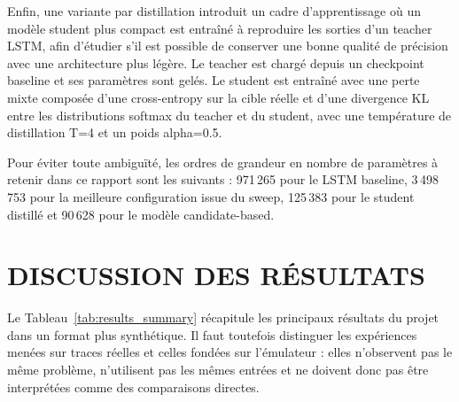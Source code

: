 \documentclass[letterpaper, 10 pt, conference]{ieeeconf}  %
\begin{document}
Enfin, une variante par distillation introduit un cadre d'apprentissage où un modèle student plus compact est entraîné à reproduire les sorties d'un teacher LSTM, afin d'étudier s'il est possible de conserver une bonne qualité de précision avec une architecture plus légère.
Le teacher est chargé depuis un checkpoint baseline et ses paramètres sont gelés. Le student est entraîné avec une perte mixte composée d’une cross-entropy sur la cible réelle et d’une divergence KL entre les distributions softmax du teacher et du student, avec une température de distillation T=4 et un poids alpha=0.5.

Pour éviter toute ambiguïté, les ordres de grandeur en nombre de paramètres à retenir dans ce rapport sont les suivants : 971\,265 pour le LSTM baseline, 3\,498\,753 pour la meilleure configuration issue du sweep, 125\,383 pour le student distillé et 90\,628 pour le modèle candidate-based.


\section{DISCUSSION DES RÉSULTATS}

Le Tableau~\ref{tab:results_summary} récapitule les principaux résultats du projet dans un format plus synthétique. Il faut toutefois distinguer les expériences menées sur traces réelles et celles fondées sur l'émulateur : elles n'observent pas le même problème, n'utilisent pas les mêmes entrées et ne doivent donc pas être interprétées comme des comparaisons directes.

\begin{table}[t]
\centering
\scriptsize
\setlength{\tabcolsep}{3pt}
\renewcommand{\arraystretch}{1.05}
\caption{Synthèse des résultats principaux. Les deux dernières lignes relèvent d'un cadre expérimental distinct fondé sur un émulateur et ne sont donc pas directement comparables aux trois premières.}
\label{tab:results_summary}
\end{table}
\end{document}
